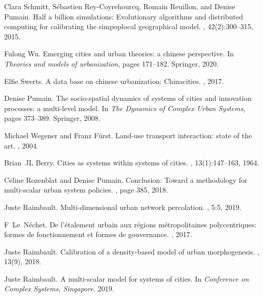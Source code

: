\documentclass[11pt]{article}
\begin{document}
\begin{thebibliography}{10}
Clara Schmitt, S{\'e}bastien Rey-Coyrehourcq, Romain Reuillon, and Denise
  Pumain.
\newblock Half a billion simulations: Evolutionary algorithms and distributed
  computing for calibrating the simpoplocal geographical model.
,
  42(2):300--315, 2015.

Fulong Wu.
\newblock Emerging cities and urban theories: a chinese perspective.
\newblock In {\em Theories and models of urbanization}, pages 171--182.
  Springer, 2020.

Elfie Swerts.
\newblock A data base on chinese urbanization: Chinacities.
, 2017.

Denise Pumain.
\newblock The socio-spatial dynamics of systems of cities and innovation
  processes: a multi-level model.
\newblock In {\em The Dynamics of Complex Urban Systems}, pages 373--389.
  Springer, 2008.

Michael Wegener and Franz F{\"u}rst.
\newblock Land-use transport interaction: state of the art.
, 2004.

Brian~JL Berry.
\newblock Cities as systems within systems of cities.
, 13(1):147--163, 1964.

Celine Rozenblat and Denise Pumain.
\newblock Conclusion: Toward a methodology for multi-scalar urban system
  policies.
,
  page 385, 2018.

Juste Raimbault.
\newblock Multi-dimensional urban network percolation.
, 5:5, 2019.

F~Le~N{\'e}chet.
\newblock De l’{\'e}talement urbain aux r{\'e}gions m{\'e}tropolitaines
  polycentriques: formes de fonctionnement et formes de gouvernance.
, 2017.

Juste Raimbault.
\newblock Calibration of a density-based model of urban morphogenesis.
, 13(9), 2018.

Juste Raimbault.
\newblock A multi-scalar model for systems of cities.
\newblock In {\em Conference on Complex Systems, Singapore}. 2019.

\end{thebibliography}



\end{document}
